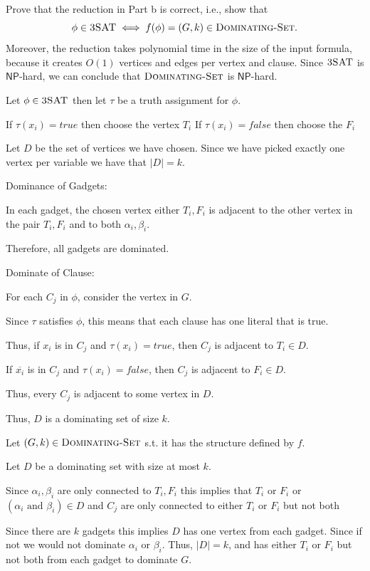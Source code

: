 \documentclass[12pt, letterpaper]{article}
\newcommand{\NP}{\mathsf{NP}}
\renewcommand{\t}[1]{\text{#1}}
\begin{document}
\begin{subproblem}{}
    Prove that the reduction in Part b is correct, i.e., show that 
        \[
            \phi \in \textsc{3SAT} \iff f(\phi) = (G,k) \in \textsc{Dominating-Set}.
        \]
        Moreover, the reduction takes polynomial time in the size of the input formula, because it creates $O(1)$ vertices and edges per vertex and clause. Since $\textsc{3SAT}$ is $\NP$-hard, we can conclude that $\textsc{Dominating-Set}$ is $\NP$-hard.
\end{subproblem}
\begin{problemproof}
    Let $\phi \in \textsc{3SAT}$ then let $\tau$ be a truth assignment for $\phi$.

    If $\tau(x_i)=true$ then choose the vertex $T_i$
    If $\tau(x_i)=false$ then choose the $F_i$

    Let $D$ be the set of vertices we have chosen. Since we have picked exactly one vertex per variable we have that $|D|=k$.

    Dominance of Gadgets:

    In each gadget, the chosen vertex either $T_i,F_i$ is adjacent to the other vertex in the pair $T_i,F_i$ and to both $\alpha_i,\beta_i$.

    Therefore, all gadgets are dominated.

    Dominate of Clause:

    For each $C_j$ in $\phi$, consider the vertex in $G$.

    Since $\tau$ satisfies $\phi$, this means that each clause has one literal that is true.

    Thus, if $x_i$ is in $C_j$ and $\tau(x_i)=true$, then $C_j$ is adjacent to $T_i \in D$.

    If $\overline{x_i}$ is in $C_j$ and $\tau(x_i)=false$, then $C_j$ is adjacent to $F_i \in D$.

    Thus, every $C_j$ is adjacent to some vertex in $D$.

    Thus, $D$ is a dominating set of size $k$.

    Let $(G,k) \in \textsc{Dominating-Set}$ s.t. it has the structure defined by $f$.

    Let $D$ be a dominating set with size at most $k$.

    Since $\alpha_i,\beta_i$ are only connected to $T_i,F_i$ this implies that $T_i$ or $F_i$ or $(\alpha_i \t{ and } \beta_i) \in D$ and $C_j$ are only connected to either $T_i$ or $F_i$ but not both

    Since there are $k$ gadgets this implies $D$ has one vertex from each gadget. Since if not we would not dominate $\alpha_i$ or $\beta_i$. Thus, $|D|=k$, and has either $T_i$ or $F_i$ but not both from each gadget to dominate $G$.


\end{problemproof}
\end{document}
